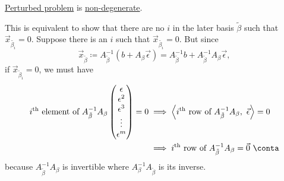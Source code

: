 \begin{answer}
	\begin{claim}
		\hyperref[def:perturbed-problem]{Perturbed problem} is \hyperref[def:non-degenerate-hypothesis]{non-degenerate}.
	\end{claim}
	\begin{explanation}
		This is equivalent to show that there are no \(i\) in the later basis \(\tilde{\beta}\) such that \(\vec{x}_{\tilde{\beta_i}} = 0\). Suppose there is an \(i\) such that
		\(\vec{x}_{\tilde{\beta_i}} = 0\). But since
		\[
			\vec{x}_{\tilde{\beta}} \coloneqq A^{-1}_{\tilde{\beta}}(b + A_{\beta}\vec{\epsilon}) = A^{-1}_{\tilde{\beta}}b + A^{-1}_{\tilde{\beta}}A_{\beta}\vec{\epsilon},
		\]
		if \(\vec{x} _{\widetilde{\beta}_i} = 0\), we must have
		\[
			\begin{split}
				i^{\text{th}} \text{ element of }A^{-1}_{\tilde{\beta}}A_{\beta}\begin{pmatrix}
					\epsilon   \\
					\epsilon^2 \\
					\epsilon^3 \\
					\vdots     \\
					\epsilon^m \\
				\end{pmatrix} = 0
				&\implies \left< i^{\text{th}} \text{ row of } A^{-1}_{\tilde{\beta}}A_{\beta},\ \vec{\epsilon} \right> = 0\\
				&\implies i^{\text{th}} \text{ row of } A^{-1}_{\tilde{\beta}}A_{\beta} = \vec{0}\ \conta
			\end{split}
		\]
		because \(A^{-1}_{\tilde{\beta}}A_{\beta}\) is invertible where \(A^{-1}_{\beta}A_{\tilde{\beta}}\) is its inverse.
	\end{explanation}
\end{answer}